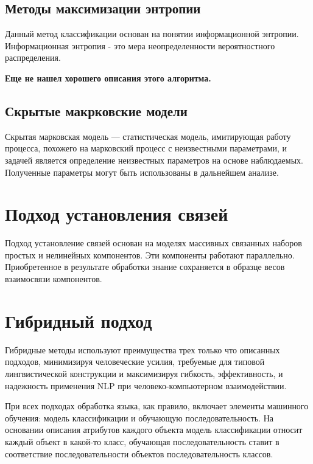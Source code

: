 \documentclass{standalone}
\begin{document}
\subsection{Методы максимизации энтропии} %

\par Данный метод классификации основан на понятии информационной энтропии. Информационная энтропия - это мера неопределенности вероятностного распределения.
\par \textbf{Еще не нашел хорошего описания этого алгоритма.}

\subsection{Скрытые макрковские модели} %
\par Скрытая марковская модель — статистическая модель, имитирующая работу процесса, похожего на марковский процесс с неизвестными параметрами, и задачей является определение неизвестных параметров на основе наблюдаемых. Полученные параметры могут быть использованы в дальнейшем анализе.

\section{Подход установления связей}
\par Подход установление связей основан на моделях массивных связанных наборов простых и нелинейных компонентов. Эти компоненты работают параллельно. Приобретенное в результате обработки знание сохраняется в образце весов взаимосвязи компонентов.
\section{Гибридный подход}
\par Гибридные методы используют преимущества трех только что описанных подходов, минимизируя человеческие усилия, требуемые для типовой лингвистической конструкции и максимизируя гибкость, эффективность, и надежность применения NLP при человеко-компьютерном взаимодействии.

\par При всех подходах обработка языка, как правило, включает элементы машинного обучения: модель классификации и обучающую последовательность. На основании описания атрибутов каждого объекта модель классификации относит каждый объект в какой-то класс, обучающая последовательность ставит в соответствие последовательности объектов последовательность классов.
\end{document}
